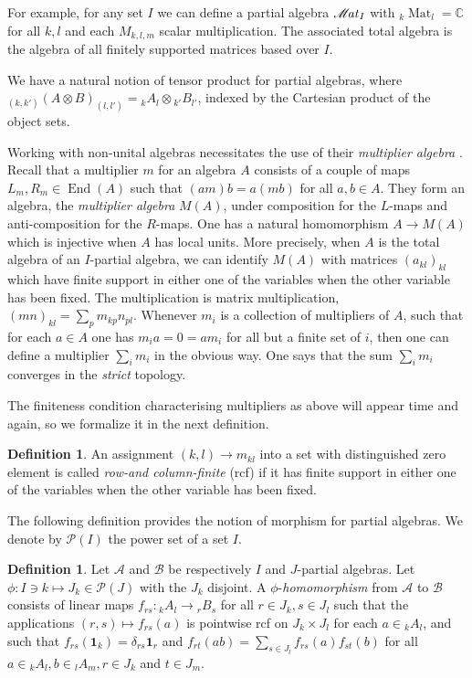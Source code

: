 \documentclass[10pt]{article}
\DeclareMathOperator{\End}{\mathrm{End}}
\DeclareMathOperator{\Mat}{\mathscr{M}\!\it{at}}
\DeclareMathOperator{\Matt}{\mathrm{Mat}}
\newcommand{\C}{\mathbb{C}}
\newcommand{\GrDA}[3]{{}_{#2}#1_{#3}} %
\newcommand{\Unit}{\mathbf{1}}
\theoremstyle{definition}
\newtheorem{Def}[Theorem]{Definition}
\numberwithin{equation}{section}
\begin{document}
For example, for any set $I$ we can define a partial algebra $\Mat_I$ with $\GrDA{\Matt}{k}{l} = \C$ for all $k,l$ and each $M_{k,l,m}$ scalar multiplication. The associated total algebra is the algebra of all finitely supported matrices based over $I$.

We have a natural notion of tensor product for partial algebras, where $\GrDA{(A\otimes B)}{(k,k')}{(l,l')} = \GrDA{A}{k}{l}\otimes \GrDA{B}{k'}{l'}$, indexed by the Cartesian product of the object sets. 

Working with non-unital algebras necessitates the use of their \emph{multiplier algebra} \cite{Dau1,VDae1}. Recall that a multiplier $m$ for an algebra $A$ consists of a couple of maps $L_m, R_m\in \End(A)$ such that $(am)b = a(mb)$ for all $a,b\in A$. They form an algebra, the \emph{multiplier algebra} $M(A)$, under composition for the $L$-maps and anti-composition for the $R$-maps. One has a natural homomorphism $A\rightarrow M(A)$ which is injective when $A$ has local units. More precisely, when $A$ is the total algebra of an $I$-partial algebra, we can identify $M(A)$ with matrices $(a_{kl})_{kl}$ which have finite support in either one of the variables when the other variable has been fixed. The multiplication is matrix multiplication, $(mn)_{kl} = \sum_p m_{kp}n_{pl}$. Whenever $m_i$ is a collection of multipliers of $A$, such that for each $a\in A$ one has $m_ia =0=am_i$ for all but a finite set of $i$, then one can define a multiplier $\sum_i m_i$ in the obvious way. One says that the sum $\sum_i m_i$ converges in the \emph{strict} topology. 
 
The finiteness condition characterising multipliers as above will appear time and again, so we formalize it in the next definition. 
 
\begin{Def} An assignment $(k,l)\rightarrow m_{kl}$ into a set with distinguished zero element is called \emph{row-and column-finite} (rcf) if it has finite support in either one of the variables when the other variable has been fixed. 
\end{Def} 


The following definition provides the notion of morphism for partial algebras. We denote by $\mathscr{P}(I)$ the power set of a set $I$.

\begin{Def}\label{DefMor} Let $\mathscr{A}$ and $\mathscr{B}$ be respectively $I$ and $J$-partial algebras. Let $\phi: I \ni k \mapsto J_k \in \mathscr{P}(J)$ with the $J_k$ disjoint. A $\phi$-\emph{homomorphism} from $\mathscr{A}$ to $\mathscr{B}$ consists of linear maps $f_{rs}: \GrDA{A}{k}{l}\rightarrow \GrDA{B}{r}{s}$ for all $r\in J_k, s\in J_l$ such that the applications $(r,s) \mapsto f_{rs}(a)$ is pointwise rcf on $J_k\times J_l$ for each $a\in \GrDA{A}{k}{l}$, and such that $f_{rs}(\Unit_{k}) = \delta_{rs}\Unit_r$ and $f_{rt}(ab) = \sum_{s\in J_l} f_{rs}(a)f_{st}(b)$ for all $a\in \GrDA{A}{k}{l}, b\in \GrDA{A}{l}{m}, r\in J_k$ and $t\in J_m$.
\end{Def}
\end{document}
